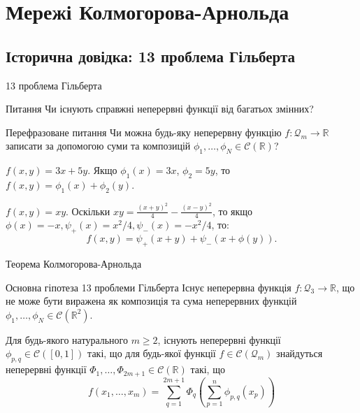 \documentclass{zkdl-presentation-template}
\begin{document}
    \section{Мережі Колмогорова-Арнольда}

    \subsection{Історична довідка: 13 проблема Гільберта}
    \begin{frame}{13 проблема Гільберта}
        \begin{alertblock}{Питання}
            Чи існують справжні неперервні функції від багатьох змінних?
        \end{alertblock}

        \begin{alertblock}{Перефразоване питання}
            Чи можна будь-яку неперервну функцію $f: \mathcal{Q}_m \to
            \mathbb{R}$ записати за допомогою суми та композицій
            $\phi_1,\dots,\phi_N \in \mathcal{C}(\mathbb{R})$?
        \end{alertblock}

        \begin{example}
            $f(x,y) = 3x+5y$. Якщо
            $\phi_1(x)=3x$, $\phi_2=5y$, то 
            $f(x,y) = \phi_1(x)+\phi_2(y)$.
        \end{example}

        \begin{example}
            $f(x,y) = xy$. Оскільки $xy=\frac{(x+y)^2}{4} - \frac{(x-y)^2}{4}$, 
            то якщо $\phi(x)=-x,\psi_+(x)=x^2/4,\psi_-(x)=-x^2/4$, то:
            \begin{equation*}
                f(x,y) = \psi_+(x+y) + \psi_-(x+\phi(y)).
            \end{equation*}
        \end{example}
    \end{frame}

    \begin{frame}{Теорема Колмогорова-Арнольда}
        \begin{block}{Основна гіпотеза 13 проблеми Гільберта}
            Існує неперервна функція $f: \mathcal{Q}_3 \to \mathbb{R}$, що не може бути
            виражена як композиція та сума неперервних функцій $\phi_1,\dots,\phi_N \in
            \mathcal{C}(\mathbb{R}^2)$.
        \end{block}

        \begin{definition}
            Для будь-якого натурального $m \geq 2$, існують неперервні функції
            $\phi_{p,q} \in \mathcal{C}([0,1])$ такі, що для будь-якої функції $f \in
            \mathcal{C}(\mathcal{Q}_m)$ знайдуться неперервні функції
            $\Phi_1,\dots,\Phi_{2m+1} \in \mathcal{C}(\mathbb{R})$ такі, що
            \begin{equation*}
                f(x_1,\dots,x_m) = \sum_{q=1}^{2m+1}\Phi_q\left(\sum_{p=1}^n \phi_{p,q}(x_p)\right)
            \end{equation*}
        \end{definition}
    \end{frame}
\end{document}

